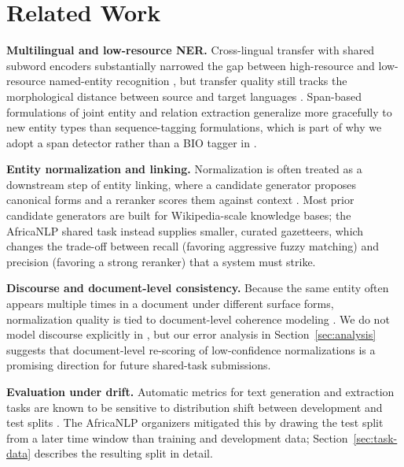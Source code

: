 \section{Related Work}

\textbf{Multilingual and low-resource NER.} Cross-lingual transfer with
shared subword encoders substantially narrowed the gap between
high-resource and low-resource named-entity recognition
\citep{oyelaran2022lowresource}, but transfer quality still tracks the
morphological distance between source and target languages
\citep{ferreira2019attention}. Span-based formulations of joint entity and
relation extraction \citep{tanaka2020span} generalize more gracefully to
new entity types than sequence-tagging formulations, which is part of why
we adopt a span detector rather than a BIO tagger in .

\textbf{Entity normalization and linking.} Normalization is often treated
as a downstream step of entity linking, where a candidate generator
proposes canonical forms and a reranker scores them against context
\citep{schneider2020adapter}. Most prior candidate generators are built for
Wikipedia-scale knowledge bases; the AfricaNLP shared task instead supplies
smaller, curated gazetteers, which changes the trade-off between recall
(favoring aggressive fuzzy matching) and precision (favoring a strong
reranker) that a system must strike.

\textbf{Discourse and document-level consistency.} Because the same entity
often appears multiple times in a document under different surface forms,
normalization quality is tied to document-level coherence modeling
\citep{nakamura2021survey}. We do not model discourse explicitly in
, but our error analysis in Section~\ref{sec:analysis}
suggests that document-level re-scoring of low-confidence normalizations is
a promising direction for future shared-task submissions.

\textbf{Evaluation under drift.} Automatic metrics for text generation and
extraction tasks are known to be sensitive to distribution shift between
development and test splits \citep{kapoor2022evaluation,
ibrahim2023calibration}. The AfricaNLP organizers mitigated this by drawing
the test split from a later time window than training and development data;
Section~\ref{sec:task-data} describes the resulting split in detail.
